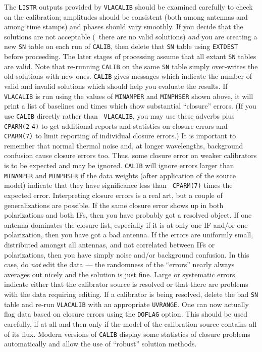      The {\tt LISTR} outputs provided by {\tt VLACALIB} should be
examined carefully to check on the calibration; amplitudes should be
consistent (both among antennas and among time stamps) and phases
should vary smoothly.  If you decide that the solutions are not
acceptable (\eg\ there are no valid solutions) {\it and\/} you are
creating a new {\tt SN} table on each run of {\tt CALIB}, then delete
that {\tt SN} table using {\tt EXTDEST} before proceeding.  The later
stages of processing assume that all extant {\tt SN} tables are valid.
Note that re-running {\tt CALIB} on the same {\tt SN} table simply
over-writes the old solutions with new ones.    {\tt CALIB} gives
messages which indicate the number of valid and invalid solutions
which should help you evaluate the results.  If {\tt VLACALIB} is run
using the values of {\tt MINAMPER} and {\tt MINPHSER} shown above, it
will print a list of baselines and times which show substantial
``closure'' errors.  (If you use {\tt CALIB} directly rather than {\tt
VLACALIB}, you may use these adverbs plus {\tt CPARM(2}-{\tt 4)} to
get additional reports and statistics on closure errors and {\tt
CPARM(7)} to limit reporting of individual closure errors.)  It is
important to remember that normal thermal noise and, at longer
wavelengths, background confusion cause closure errors too.  Thus,
some closure error on weaker calibrators is to be expected and may be
ignored.  {\tt CALIB} will ignore errors larger than {\tt MINAMPER}
and {\tt MINPHSER} if the data weights (after application of the
source model) indicate that they have significance less than {\tt
CPARM(7)} times the expected error.   Interpreting closure errors is a
real art, but a couple of generalizations are possible.  If the same
closure error shows up in both polarizations and both IFs, then you
have probably got a resolved object.  If one antenna dominates the
closure list, especially if it is at only one IF and/or one
polarization, then you have got a bad antenna.  If the errors are
uniformly small, distributed amongst all antennas, and not correlated
between IFs or polarizations, then you have simply noise and/or
background confusion.  In this case, do {\it not\/} edit the data ---
the randomness of the ``errors'' nearly always averages out nicely and
the solution is just fine.  Large or systematic errors indicate either
that the calibrator source is resolved or that there are problems with
the data requiring editing.  If a calibrator is being resolved, delete
the bad {\tt SN} table and re-run {\tt VLACALIB} with an appropriate
{\tt UVRANGE}\@.  One can now actually flag data based on closure
errors using the {\tt DOFLAG} option.  This should be used carefully,
if at all and then only if the model of the calibration source
contains all of its flux.  Modern versions of {\tt CALIB} display some
statistics of closure problems automatically and allow the use of
``robust'' solution methods.

